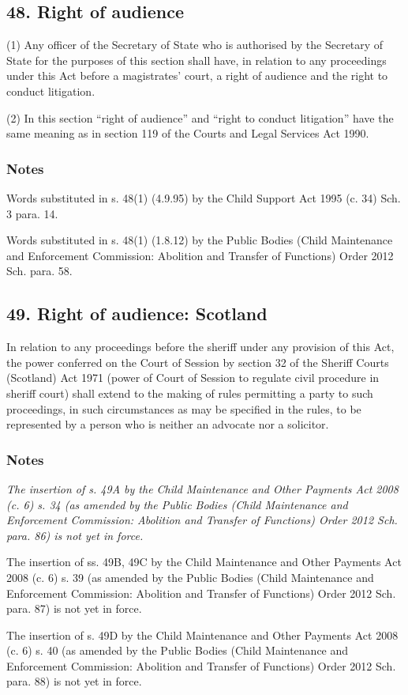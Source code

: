 \documentclass[a4paper]{article}
\newcommand\amendment[1]{\subsubsection*{Notes}{\itshape\frenchspacing\footnotesize #1 \par}}
\begin{document}
\subsection{48. Right of audience}

(1) Any officer of the Secretary of State who is authorised by the Secretary of State for the purposes of this section shall have, in relation to any proceedings under this Act before a magistrates’ court, a right of audience and the right to conduct litigation.

(2) In this section “right of audience” and “right to conduct litigation” have the same meaning as in section 119 of the Courts and Legal Services Act 1990.

\amendment{

Words substituted in s. 48(1) (4.9.95) by the Child Support Act 1995 (c. 34) Sch. 3 para. 14.

Words substituted in s. 48(1) (1.8.12) by the Public Bodies (Child Maintenance and Enforcement Commission: Abolition and Transfer of Functions) Order 2012 Sch. para. 58.

}

\subsection{49. Right of audience: Scotland}

In relation to any proceedings before the sheriff under any provision of this Act, the power conferred on the Court of Session by section 32 of the Sheriff Courts (Scotland) Act 1971 (power of Court of Session to regulate civil procedure in sheriff court) shall extend to the making of rules permitting a party to such proceedings, in such circumstances as may be specified in the rules, to be represented by a person who is neither an advocate nor a solicitor.

\amendment{
The insertion of s. 49A by the Child Maintenance and Other Payments Act 2008 (c. 6) s. 34 (as amended by the Public Bodies (Child Maintenance and Enforcement Commission: Abolition and Transfer of Functions) Order 2012 Sch. para. 86) is not yet in force.

\medskip

The insertion of ss. 49B, 49C by the Child Maintenance and Other Payments Act 2008 (c. 6) s. 39 (as amended by the Public Bodies (Child Maintenance and Enforcement Commission: Abolition and Transfer of Functions) Order 2012 Sch. para. 87) is not yet in force.

\medskip

The insertion of s. 49D by the Child Maintenance and Other Payments Act 2008 (c. 6) s. 40 (as amended by the Public Bodies (Child Maintenance and Enforcement Commission: Abolition and Transfer of Functions) Order 2012 Sch. para. 88) is not yet in force.
}
\end{document}
